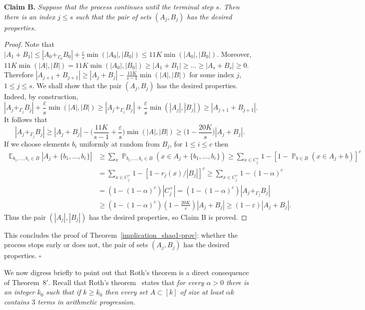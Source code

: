 \documentclass[12pt,reqno]{amsart}
\DeclareMathOperator*{\E}{\mathbb{E}}
\DeclareMathOperator*{\Prob}{\mathbb{P}}
\theoremstyle{definition}
\renewcommand\leq{\leqslant}
\renewcommand\geq{\geqslant}
\renewcommand\ge{\geqslant}
\begin{document}
\vspace{7pt}
{\bf Claim B.} {\em
Suppose that the process continues until the terminal step $s$.
Then there is an index $j\leq s$ such that the  pair of sets $(A_j,B_j)$ has the desired
properties.}
\begin{proof}
Note that $|A_{1}+B_{1}| \leq |A_0+_{\Gamma_0}B_0|+\frac{\varepsilon}{s} \min(|A_0|,|B_0|) \leq 11K \min(|A_0|,|B_0|).$
Moreover, $11K \min(|A|,|B|)= 11K \min(|A_0|,|B_0|)\geq |A_{1}+B_{1}| \geq \hdots \geq |A_{s}+B_{s}| \geq 0.$ Therefore
$|A_{j+1}+B_{j+1}|\geq |A_{j}+B_{j}|-\frac{11K}{s-1}\min(|A|,|B|)$ for some index $j$,
$1 \leq j \leq s$.  We shall
show that the pair  $(A_j,B_j)$ has the desired properties.
Indeed, by construction,
\[
|A_{j}+_{\Gamma_j}B_{j}|+\frac{\varepsilon}{s}
\min(|A|,|B|) \geq |A_{j}+_{\Gamma_j}B_{j}|+\frac{\varepsilon}{s}
\min(|A_j|,|B_j|) \geq |A_{j+1}+B_{j+1}|.
\]
It follows that
\[
|A_j+_{\Gamma_j}B_j|\geq |A_{j}+B_{j}|- \big(\frac{11K}{s-1}+\frac{\varepsilon}{s} \big)\min(|A|,|B|) \geq \big(1- \frac{20K}{s} \big)|A_{j}+B_{j}|.
\]
If we choose elements $b_i$ uniformly at random from $B_j$, for $1\leq i \leq c$ then
\begin{equation*}
\begin{split}
    \E_{b_1, \hdots, b_c \in B}|A_j+\{b_1, \hdots, b_c\}|
    & \geq \sum_x \Prob_{b_1, \hdots, b_c \in B}(x \in A_j+\{b_1, \hdots, b_c\})
      \geq \sum_{x \in C^+_j} 1-[1-\Prob_{b \in B}(x \in A_j+b)]^c\\
    & = \sum_{x \in C^+_j} 1-[1- r_j(x)/|B_j|]^c
      \geq \sum_{x \in C^+_j} 1-(1-\alpha)^c\\
    & = (1-(1-\alpha)^c) |C^+_j|
      =  (1-(1-\alpha)^c) |A_j+_{\Gamma_j}B_j|\\
    & \geq (1-(1-\alpha)^c)(1- \frac{20K}{s}) |A_{j}+B_{j}|
      \geq (1-\varepsilon)|A_{j}+B_{j}|.
\end{split}
\end{equation*}
Thus the pair $(|A_j|,|B_j|)$ has the desired properties, so Claim B is proved.
\end{proof}

\vspace{5pt}
This concludes the proof of Theorem~\ref{implication_shao1-prov}: whether the process stops early or does not, the  pair of sets $(A_j,B_j)$ has the desired
properties. \hfill{$\square$}

\vspace{5pt}

We now digress briefly  to point out that Roth's theorem is a direct consequence of Theorem~$8'$. Recall that Roth's theorem~\cite{Roth} states that
{\em for every $\alpha>0$ there is an integer $k_0$ such that if $k\ge k_0$ then every set $A\subset [k]$ of size at least $\alpha k$ contains $3$ terms in arithmetic progression.}
\end{document}
